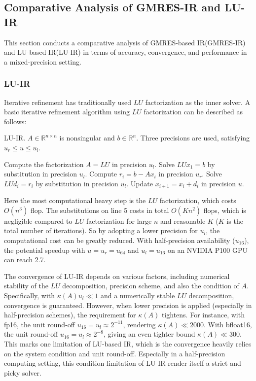 \subsection{Comparative Analysis of GMRES-IR and LU-IR}

This section conducts a comparative analysis of GMRES-based IR(GMRES-IR) and LU-based IR(LU-IR) in terms of accuracy, convergence, and performance in a mixed-precision setting.
\subsubsection{LU-IR}
Iterative refinement has traditionally used $LU$ factorization as the inner solver. A basic iterative refinement algorithm using $LU$ factorization can be described as follows:

\begin{algorithm}
    \caption{LU-IR. $A \in \mathbb{R}^{n \times n}$ is nonsingular and $b \in \mathbb{R}^n$. Three precisions are used, satisfying $u_r \leq u \leq u_l$.}
    \begin{algorithmic}[1]
        \State Compute the factorization $A = LU$ in precision $u_l$.
        \State Solve $LUx_1 = b$ by substitution in precision $u_l$.
            \State Compute $r_i = b - Ax_i$ in precision $u_r$.
            \State Solve $LUd_i = r_i$ by substitution in precision $u_l$.
            \State Update $x_{i+1} = x_i + d_i$ in precision $u$.
        \EndFor
    \end{algorithmic}
\end{algorithm}

Here the most computational heavy step is the $LU$ factorization, which costs $O(n^3)$ flop. The substitutions on line 5 costs in total $O(Kn^2)$ flops, which is negligible compared to $LU$ factorization for large $n$ and reasonable $K$ ($K$ is the total number of iterations). So by adopting a lower precision for $u_l$, the computational cost can be greatly reduced. With half-precision availability ($u_{16}$), the potential speedup with $u=u_r=u_{64}$ and $u_l=u_{16}$ on an NVIDIA P100 GPU can reach 2.7. 

The convergence of LU-IR depends on various factors, including numerical stability of the $LU$ decomposition, precision scheme, and also the condition of $A$. Specifically, with $\kappa(A)u_l \ll 1$ and a numerically stable $LU$ decomposition, convergence is guaranteed. However, when lower precision is applied (especially in half-precision schemes), the requirement for $\kappa(A)$ tightens. For instance, with fp16, the unit round-off $u_{16}=u_l\approx 2^{-11}$, rendering $\kappa(A)\ll 2000$. With bfloat16, the unit round-off $u_{16}=u_l\approx 2^{-8}$, giving an even tighter bound $\kappa(A)\ll 300$. This marks one limitation of LU-based IR, which is the convergence heavily relies on the system condition and unit round-off. Especially in a half-precision computing setting, this condition limitation of LU-IR render itself a strict and picky solver\cite{Azzam2020}.

